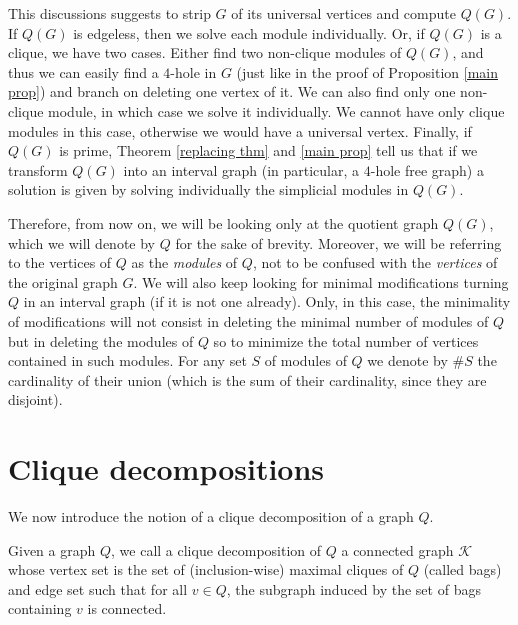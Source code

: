 \documentclass{article}
\begin{document}
    This discussions
    suggests to strip $G$ of
    its universal vertices and
    compute $Q\left(G\right)$.
    If $Q\left(G\right)$ is
    edgeless, then we
    solve
    each module individually.
    Or, if $Q\left(G\right)$ is 
    a clique, we have two cases. 
    Either
    find two
    non-clique modules of $Q\left(G\right)$,
    and thus we can easily find
    a $4$-hole in $G$ (just like
    in the proof
    of Proposition \ref{main prop})
    and branch on
    deleting one vertex of it.
    We can also find only one
    non-clique module,
    in which case we solve
    it individually.
    We cannot have only clique
    modules in this case, 
    otherwise we would have
    a universal vertex.
    Finally, if $Q\left(G\right)$
    is prime,
    Theorem \ref{replacing thm} 
    and \ref{main prop}
    tell us that if we
    transform $Q\left(G\right)$ into
    an interval graph (in particular,
    a $4$-hole free graph)
    a solution is given by
    solving individually
    the simplicial modules
    in $Q\left(G\right)$. 
    
    Therefore, from
    now on, we will be looking
    only at the quotient graph $Q\left(G\right)$,
    which we will denote by $Q$ 
    for the sake of brevity.
    Moreover, we will be referring
    to the vertices of $Q$ as the
    \emph{modules} of $Q$,
    not to be confused with the 
    \emph{vertices} of the
    original graph $G$.
    We will also keep
    looking for
    minimal modifications
    turning $Q$ in an
    interval graph (if it is not
    one already). Only,
    in this case, 
    the minimality
    of modifications will
    not consist in deleting
    the minimal number of modules
    of $Q$ but in deleting
    the modules of $Q$ so
    to minimize the total
    number of vertices
    contained in such
    modules.
    For any set $S$ of modules of $Q$ 
    we denote by $\#S$ the cardinality
    of their union (which is the
    sum of their cardinality,
    since they are disjoint).

    \section{Clique decompositions}

    We now introduce the notion of
    a clique decomposition of a graph $Q$.

    \begin{defn}
        Given a graph $Q$, we call
        a clique decomposition of $Q$ a 
        connected graph $\mathcal{K}$ whose vertex set
        is the set of (inclusion-wise)
        maximal cliques of $Q$ (called bags) and
        edge set such that for all
        $v \in Q$, the subgraph
        induced by the set of bags containing
        $v$ is connected.
    \end{defn}
\end{document}
